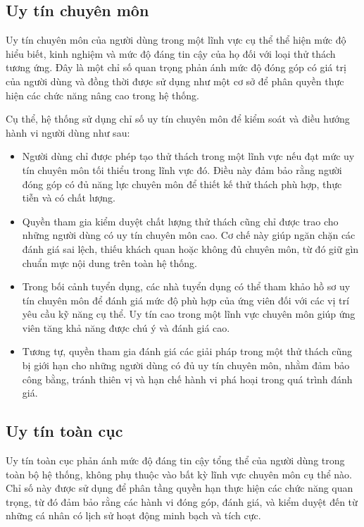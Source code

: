 \subsection{Uy tín chuyên môn}

Uy tín chuyên môn của người dùng trong một lĩnh vực cụ thể thể hiện mức độ hiểu biết, kinh nghiệm và mức độ đáng tin cậy của họ đối với loại thử thách tương ứng.
Đây là một chỉ số quan trọng phản ánh mức độ đóng góp có giá trị của người dùng và đồng thời được sử dụng như một cơ sở để phân quyền thực hiện các chức năng nâng cao trong hệ thống.

Cụ thể, hệ thống sử dụng chỉ số uy tín chuyên môn để kiểm soát và điều hướng hành vi người dùng như sau:

\begin{itemize}
  \item Người dùng chỉ được phép tạo thử thách trong một lĩnh vực nếu đạt mức uy tín chuyên môn tối thiểu trong lĩnh vực đó. Điều này đảm bảo rằng người đóng góp có đủ năng lực chuyên môn để thiết kế thử thách phù hợp, thực tiễn và có chất lượng.
  \item Quyền tham gia kiểm duyệt chất lượng thử thách cũng chỉ được trao cho những người dùng có uy tín chuyên môn cao. Cơ chế này giúp ngăn chặn các đánh giá sai lệch, thiếu khách quan hoặc không đủ chuyên môn, từ đó giữ gìn chuẩn mực nội dung trên toàn hệ thống.
  \item Trong bối cảnh tuyển dụng, các nhà tuyển dụng có thể tham khảo hồ sơ uy tín chuyên môn để đánh giá mức độ phù hợp của ứng viên đối với các vị trí yêu cầu kỹ năng cụ thể. Uy tín cao trong một lĩnh vực chuyên môn giúp ứng viên tăng khả năng được chú ý và đánh giá cao.
  \item Tương tự, quyền tham gia đánh giá các giải pháp trong một thử thách cũng bị giới hạn cho những người dùng có đủ uy tín chuyên môn, nhằm đảm bảo công bằng, tránh thiên vị và hạn chế hành vi phá hoại trong quá trình đánh giá.
\end{itemize}

\subsection{Uy tín toàn cục}

Uy tín toàn cục phản ánh mức độ đáng tin cậy tổng thể của người dùng trong toàn bộ hệ thống, không phụ thuộc vào bất kỳ lĩnh vực chuyên môn cụ thể nào.
Chỉ số này được sử dụng để phân tầng quyền hạn thực hiện các chức năng quan trọng, từ đó đảm bảo rằng các hành vi đóng góp, đánh giá, và kiểm duyệt đến từ những cá nhân có lịch sử hoạt động minh bạch và tích cực.

